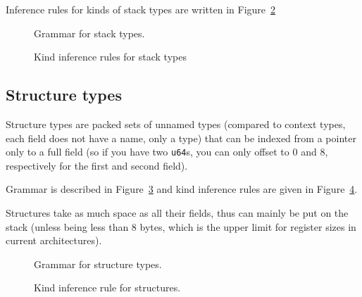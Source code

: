 Inference rules for kinds of stack types are written in Figure~\ref{fig:nstar-common-ts-stack-types-kindrules}

\begin{figure}[htb]
  \centering
  \caption{Grammar for stack types.}
  \label{fig:nstar-common-ts-stack-types-syntax}
\end{figure}

\begin{figure}[htb]
  \centering

  \begin{prooftree}
  \end{prooftree}

  \caption{Kind inference rules for stack types}
  \label{fig:nstar-common-ts-stack-types-kindrules}
\end{figure}

\subsection{Structure types}\label{subsec:nstar-common-ts-structs}

Structure types are packed sets of unnamed types (compared to context types, each field does not have a name, only a type) that can be indexed from a pointer only to a full field (so if you have two \texttt{u64}s, you can only offset to $0$ and $8$, respectively for the first and second field).

Grammar is described in Figure~\ref{fig:nstar-common-ts-structs-syntax} and kind inference rules are given in Figure~\ref{fig:nstar-common-ts-structs-kindrules}.

Structures take as much space as all their fields, thus can mainly be put on the stack (unless being less than 8 bytes, which is the upper limit for register sizes in current architectures).

\begin{figure}[htb]
  \centering

  \caption{Grammar for structure types.}
  \label{fig:nstar-common-ts-structs-syntax}
\end{figure}

\begin{figure}[H]
  \centering
  \begin{prooftree}
  \end{prooftree}

  \caption{Kind inference rule for structures.}
  \label{fig:nstar-common-ts-structs-kindrules}
\end{figure}

